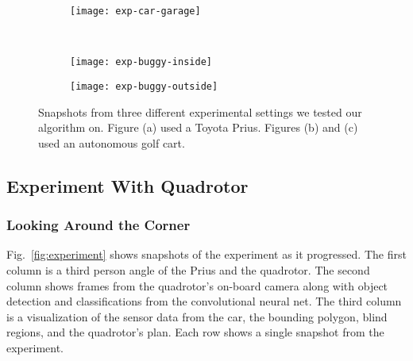 \begin{figure}[t!]

    \centering

    \begin{subfigure}[t]{0.49\textwidth}

        \centering
        \texttt{[image: exp-car-garage]}
        \caption{}

        \label{fig:exp-car-garage}

    \end{subfigure}
    ~
    \begin{subfigure}[t]{0.49\textwidth}

        \centering
        \texttt{[image: exp-buggy-inside]}
        \caption{}

        \label{fig:exp-buggy-inside}

    \end{subfigure}

    \vspace*{1mm}

    \begin{subfigure}[t]{0.5\textwidth}

        \centering
        \texttt{[image: exp-buggy-outside]}
        \caption{}

        \label{fig:exp-buggy-outside}

    \end{subfigure}

    \caption{Snapshots from three different experimental settings we tested our
    algorithm on. Figure (a) used a Toyota Prius. Figures (b) and (c) used an
autonomous golf cart.}

    \label{fig:exps}

\end{figure}

\subsection{Experiment With Quadrotor}

\subsubsection{Looking Around the Corner}

Fig.~\ref{fig:experiment} shows snapshots of the experiment as it progressed.
The first column is a third person angle of the Prius and the quadrotor. The
second column shows frames from the quadrotor's on-board camera along with
object detection and classifications from the convolutional neural net. The
third column is a visualization of the sensor data from the car, the bounding
polygon, blind regions, and the quadrotor's plan. Each row shows a single
snapshot from the experiment.

